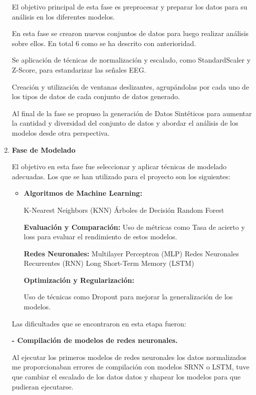 \begin{enumerate}
El objetivo principal de esta fase es preprocesar y preparar los datos para su análisis en los diferentes modelos.

En esta fase se crearon nuevos conjuntos de datos para luego realizar análisis sobre ellos. En total 6 como se ha descrito con anterioridad.

Se aplicación de técnicas de normalización y escalado, como StandardScaler y Z-Score, para estandarizar las señales EEG.

Creación y utilización de ventanas deslizantes, agrupándolas por cada uno de los tipos de datos de cada conjunto de datos generado.

Al final de la fase se propuso la generación de Datos Sintéticos para aumentar la cantidad y diversidad del conjunto de datos y abordar el análisis de los modelos desde otra perspectiva.

\item
\textbf{Fase de Modelado}

El objetivo en esta fase fue seleccionar y aplicar técnicas de modelado adecuadas. Los que se han utilizado para el proyecto son los siguientes:

	\begin{itemize}
	
	\item
	\textbf{Algoritmos de Machine Learning:}

	K-Nearest Neighbors (KNN)
	Árboles de Decisión
	Random Forest

	\textbf{Evaluación y Comparación:}
	Uso de métricas como Tasa de acierto y loss para evaluar el rendimiento de estos modelos.

	\textbf{Redes Neuronales:}
	Multilayer Perceptron (MLP)
	Redes Neuronales Recurrentes (RNN)
	Long Short-Term Memory (LSTM)

	\textbf{Optimización y Regularización:} 

	Uso de técnicas como Dropout para mejorar la generalización de los modelos.
	\end{itemize}


Las dificultades que se encontraron en esta etapa fueron:

\textbf{- Compilación de modelos de redes neuronales. }

	Al ejecutar los primeros modelos de redes neuronales los datos normalizados me proporcionaban errores de compilación con modelos SRNN o LSTM, tuve que cambiar el escalado de los datos datos y shapear los modelos para que pudieran ejecutarse.


\end{enumerate}
